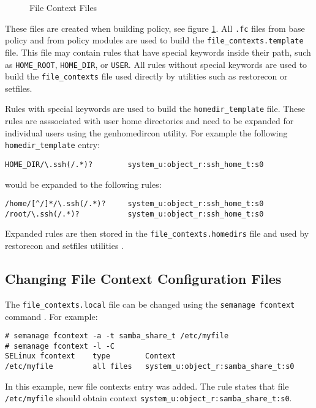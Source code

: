 \begin{figure}
    \centering
    \label{fig:filecontexts}
    
    \caption{File Context Files}
\end{figure}

These files are created when building policy, see figure \ref{fig:filecontexts}.
All \texttt{.fc} files from base policy and from policy modules are used to
build the \texttt{file\_contexts.template} file. This file may contain rules
that have special keywords inside their path, such as \texttt{HOME\_ROOT},
\texttt{HOME\_DIR}, or \texttt{USER}. All rules without special keywords are
used to build the \texttt{file\_contexts} file used directly by utilities such
as restorecon or setfiles.

Rules with special keywords are used to build the \texttt{homedir\_template}
file. These rules are asssociated with user home directories and need to be
expanded for individual users using the genhomedircon utility. For example the
following \texttt{homedir\_template} entry:
\begin{lstlisting}
HOME_DIR/\.ssh(/.*)?        system_u:object_r:ssh_home_t:s0
\end{lstlisting}
would be expanded to the following rules:
\begin{lstlisting}
/home/[^/]*/\.ssh(/.*)?     system_u:object_r:ssh_home_t:s0
/root/\.ssh(/.*)?           system_u:object_r:ssh_home_t:s0
\end{lstlisting}
Expanded rules are then stored in the \texttt{file\_contexts.homedirs} file and
used by restorecon and setfiles utilities \cite[pp.~134--140]{tsn}.

\subsection{Changing File Context Configuration Files}
The \texttt{file\_contexts.local} file can be changed using the \texttt{semanage
fcontext} command \cite{selinuxguide}. For example:
\begin{lstlisting}
# semanage fcontext -a -t samba_share_t /etc/myfile
# semanage fcontext -l -C
SELinux fcontext    type        Context
/etc/myfile         all files   system_u:object_r:samba_share_t:s0
\end{lstlisting}
In this example, new file contexts entry was added. The rule states that file
\texttt{/etc/myfile} should obtain context
\texttt{system\_u:object\_r:samba\_share\_t:s0}.

